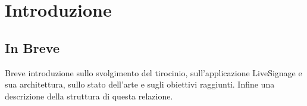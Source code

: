 \chapter{Introduzione}
\linespread{1.5}

\section{In Breve}
Breve introduzione sullo svolgimento del tirocinio, sull'applicazione LiveSignage e sua architettura, sullo stato dell'arte e sugli obiettivi raggiunti. Infine una descrizione della struttura di questa relazione.
